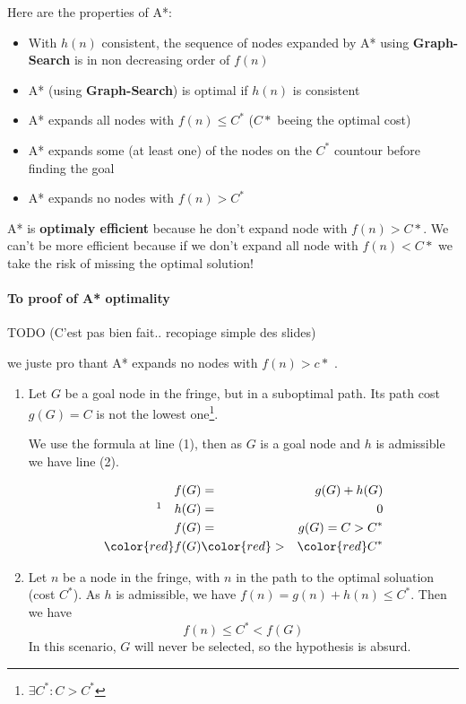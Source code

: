 Here are the properties of A*:
\begin{itemize}
    \item With $h(n)$ consistent, the sequence of nodes expanded by A* using \textbf{Graph-Search} is in non decreasing order of $f(n)$
    \item A* (using \textbf{Graph-Search}) is optimal if $h(n)$ is consistent
    \item A* expands all nodes with $f(n) \leq C^*$ ($C*$ beeing the optimal cost)
    \item A* expands some (at least one) of the nodes on the $C^*$ countour before finding the goal
    \item A* expands no nodes with $f(n) > C^*$ 
\end{itemize}

A*  is \textbf{optimaly  efficient} because  he don't  expand node  with
$f(n) > C*$. We  can't be more efficient because if  we don't expand all
node with $f(n) < C*$ we take the risk of missing the optimal solution!


\paragraph{To proof of A* optimality}
TODO (C'est pas bien fait.. recopiage simple des slides)

we juste pro thant A* expands no nodes with $f(n) > c*$ .
\begin{enumerate}

    \item Let  $G$ be  a goal node  in the fringe,  but in  a suboptimal
    path. Its path cost $g(G)=C$ is not the lowest one\footnote{$\exists
    C^* : C  > C^*$}. 
    
    We use the  formula at line (1), then as  $G$ is a
    goal node and $h$ is admissible we have line (2).

        \begin{eqnarray}
            f(G) &=& g(G) + h(G)\\
            \footnotemark\quad h(G) &=& 0 \\
            f(G) &=& g(G) = C > C^*\\
            \color{red}f(G) &\color{red}>&\color{red} C^*
        \end{eqnarray}

    \item Let $n$ be a node in the fringe, with $n$ in the path to the optimal soluation (cost $C^*$). As $h$ is admissible, we have $f(n) = g(n) + h(n) \leq C^*$. Then we have
    $$f(n) \leq C^* < f(G)$$
    In this scenario, $G$ will never be selected, so the hypothesis is absurd. 
\end{enumerate}

